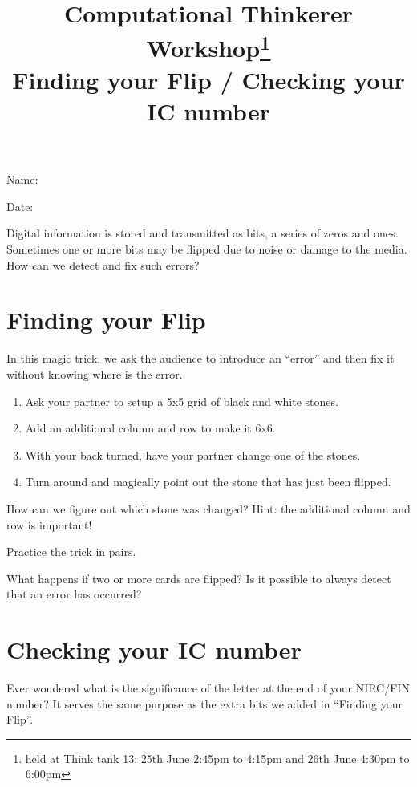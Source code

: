 \documentclass[a4paper,12pt]{article}
\title{Computational Thinkerer Workshop\footnote{held at Think tank 13: 25th June 2:45pm to 4:15pm and 26th June 4:30pm to 6:00pm}\\
Finding your Flip / Checking your IC number
\vspace{-2cm}}
\date{}
\newcommand\Blank[2][.33\linewidth]{%
  \rule{0pt}{4ex}%
  #2\enspace
  \makebox[#1]{\hrulefill}}
\begin{document}
\maketitle
\begin{flushright}
  \Blank{Name:}

  \Blank{Date:}
\end{flushright}

Digital information is stored and transmitted as bits, a series of
zeros and ones. Sometimes one or more bits may be flipped due to noise or damage
to the media. How can we detect and fix such errors?

\section{Finding your Flip}
In this magic trick, we ask the audience to introduce an ``error'' and then fix
it without knowing where is the error.
\begin{enumerate}
    \item Ask your partner to setup a 5x5 grid of black and white stones.
    \item Add an additional column and row to make it 6x6.
    \item With your back turned, have your partner change one of the stones.
    \item Turn around and magically point out the stone that has just been flipped.
\end{enumerate}

\begin{question}[skip-below=3\baselineskip]
How can we figure out which stone was changed? Hint: the additional
column and row is important!
\end{question}

\begin{question}[skip-below=3\baselineskip]
Practice the trick in pairs.
\end{question}

\begin{question}[skip-below=3\baselineskip]
What happens if two or more cards are flipped? Is it possible to always detect
that an error has occurred?
\end{question}


\newpage
\section{Checking your IC number}
Ever wondered what is the significance of the letter at the end of your NIRC/FIN
number? It serves the same purpose as the extra bits we added in
``Finding your Flip''.
\end{document}
